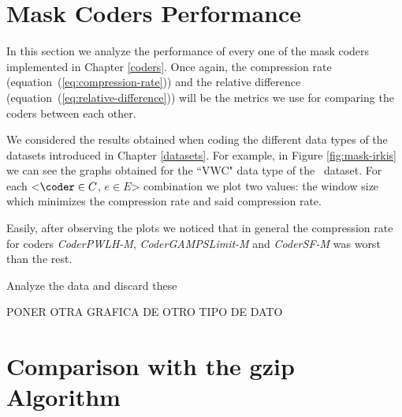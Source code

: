 











\clearpage
\section{Mask Coders Performance}
\label{secX:codersmask}

In this section we analyze the performance of every one of the mask coders implemented in Chapter \ref{coders}. Once again, the compression rate (equation~(\ref{eq:compression-rate})) and the relative difference (equation~(\ref{eq:relative-difference})) will be the metrics we use for comparing the coders between each other.

We considered the results obtained when coding the different data types of the datasets introduced in Chapter \ref{datasets}. For example, in Figure \ref{fig:mask-irkis} we can see the graphs obtained for the ``VWC" data type of the \datasetirkis \ dataset. For each <$\coder \in C$, $e \in E$> combination we plot two values: the window size which minimizes the compression rate and said compression rate.

Easily, after observing the plots we noticed that in general the compression rate for coders \textit{CoderPWLH-M}, \textit{CoderGAMPSLimit-M} and \textit{CoderSF-M} was worst than the rest.

Analyze the data and discard these 

PONER OTRA GRAFICA DE OTRO TIPO DE DATO

\clearpage


\clearpage



\clearpage

\clearpage







\clearpage
\section{Comparison with the gzip Algorithm}
\label{secX:gzip}